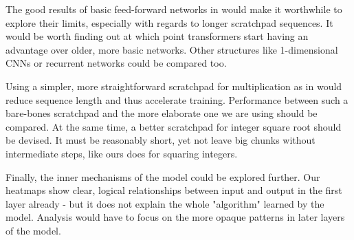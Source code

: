 The good results of basic feed-forward networks in \cite{visual} would make it worthwhile to explore their limits, especially with regards to longer scratchpad sequences. It would be worth finding out at which point transformers start having an advantage over older, more basic networks. Other structures like 1-dimensional CNNs or recurrent networks could be compared too.

Using a simpler, more straightforward scratchpad for multiplication as in \cite{implicit} would reduce sequence length and thus accelerate training. Performance between such a bare-bones scratchpad and the more elaborate one we are using should be compared.
At the same time, a better scratchpad for integer square root should be devised. It must be reasonably short, yet not leave big chunks without intermediate steps, like ours does for squaring integers.

Finally, the inner mechanisms of the model could be explored further. Our heatmaps show clear, logical relationships between input and output in the first layer already - but it does not explain the whole "algorithm" learned by the model. Analysis would have to focus on the more opaque patterns in later layers of the model.